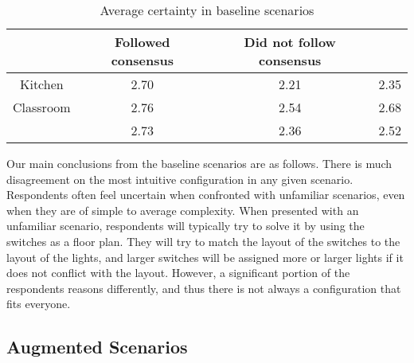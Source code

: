 \begin{table}
    \centering
    \begin{tabular}{|c|c c|c|} 
    \hline
              & Followed consensus & Did not follow consensus &      \\
    \hline
    Kitchen   &               2.70 &                     2.21 & 2.35 \\
    Classroom &               2.76 &                     2.54 & 2.68 \\
    \hline
              &               2.73 &                     2.36 & 2.52 \\
    \hline
\end{tabular}
\caption{Average certainty in baseline scenarios}
\label{table:preliminary_study_baseline_certainties}
\end{table}

Our main conclusions from the baseline scenarios are as follows. There is much disagreement on the most intuitive configuration in any given scenario. Respondents often feel uncertain when confronted with unfamiliar scenarios, even when they are of simple to average complexity. When presented with an unfamiliar scenario, respondents will typically try to solve it by using the switches as a floor plan. They will try to match the layout of the switches to the layout of the lights, and larger switches will be assigned more or larger lights if it does not conflict with the layout. However, a significant portion of the respondents reasons differently, and thus there is not always a configuration that fits everyone.

\subsection{Augmented Scenarios} \label{sec:preliminary_study:augmented_scenarios}




